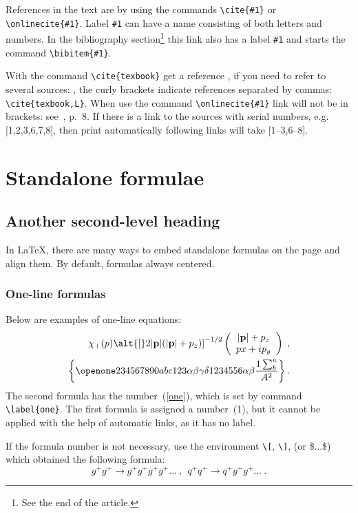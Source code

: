\documentclass[
11pt,%
tightenlines,%
twoside,%
onecolumn,%
nofloats,%
nobibnotes,%
nofootinbib,%
superscriptaddress,%
noshowpacs,%
centertags]%
{revtex4}
\begin{document}
References in the text are by using the commands
\verb+\cite{#1}+ or \verb+\onlinecite{#1}+. Label \verb+#1+
can have a name consisting of both letters and numbers. In
the bibliography section\footnote{See the end of the article.} this link also has a label \verb+#1+ and starts the command \verb+\bibitem{#1}+.

With the command \verb+\cite{texbook}+ get a reference \cite{texbook},
if you need to refer to several sources:
\cite{texbook,L}, the curly brackets indicate references
separated by commas: \verb+\cite{texbook,L}+. When
use the command \verb|\onlinecite{#1}| link will not be
in brackets: see~, p.~8.
If there is a link to the sources with serial numbers,
e.g. [1,2,3,6,7,8], then print automatically following links will take
[1--3,6--8].

\section{Standalone formulae}

\subsection{Another second-level heading}

In \LaTeX, there are many ways to embed standalone formulas
on the page and align them. By default, formulas always
centered.

\subsubsection{One-line formulas}

Below are examples of one-line equations:
\begin{eqnarray}
\chi_+(p)\alt{\bf [}2|{\bf p}|(|{\bf p}|+p_z){\bf ]}^{-1/2}
\left(
\begin{array}{c}
|{\bf p}|+p_z\\
px+ip_y
\end{array}\right)\;,
\\
\left\{%
\openone234567890abc123\alpha\beta\gamma\delta1234556\alpha\beta
\frac{1\sum^{a}_{b}}{A^2}%
\right\}%
\label{one}.
\end{eqnarray}
The second formula has the number~(\ref{one}), which is set by command
\verb|\label{one}|. The first formula is assigned a number~(1), but
it cannot be applied with the help of automatic links,
as it has no label.

If the formula number is not necessary, use the environment
\verb+\[+, \verb+\]+, (or \$...\$) which obtained the following formula:
\[g^+g^+ \rightarrow g^+g^+g^+g^+ \dots ~,~~q^+q^+\rightarrow
q^+g^+g^+ \dots ~. \] %
\end{document}
